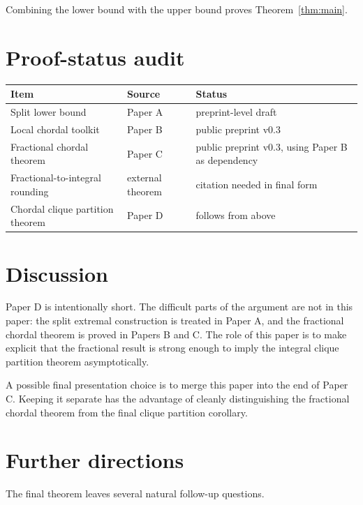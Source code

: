 \documentclass[11pt]{article}
\theoremstyle{definition}
\begin{document}
Combining the lower bound with the upper bound proves Theorem~\ref{thm:main}.

\section{Proof-status audit}

\begin{center}
\begin{tabular}{lll}
\toprule
Item & Source & Status\\
\midrule
Split lower bound & Paper A & preprint-level draft\\
Local chordal toolkit & Paper B & public preprint v0.3\\
Fractional chordal theorem & Paper C & public preprint v0.3, using Paper B as dependency\\
Fractional-to-integral rounding & external theorem & citation needed in final form\\
Chordal clique partition theorem & Paper D & follows from above\\
\bottomrule
\end{tabular}
\end{center}

\section{Discussion}

Paper D is intentionally short. The difficult parts of the argument are not in this paper: the split extremal construction is treated in Paper A, and the fractional chordal theorem is proved in Papers B and C. The role of this paper is to make explicit that the fractional result is strong enough to imply the integral clique partition theorem asymptotically.

A possible final presentation choice is to merge this paper into the end of Paper C. Keeping it separate has the advantage of cleanly distinguishing the fractional chordal theorem from the final clique partition corollary.


\section{Further directions}

The final theorem leaves several natural follow-up questions.
\end{document}
